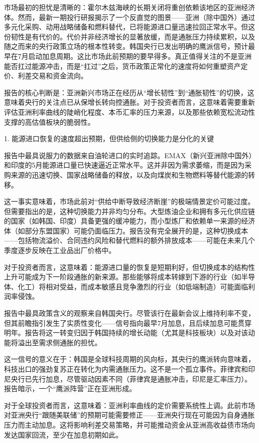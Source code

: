 \documentclass[11pt]{ctexart}
\begin{document}
市场最初的担忧是清晰的：霍尔木兹海峡的长期关闭将重创依赖该地区的亚洲经济体。然而，最新一期投行研报揭示了一个反直觉的图景——亚洲（除中国外）通过多元化采购、动用战略储备和燃料替代，已将能源进口量迅速拉回正常水平。但这份韧性是有代价的。代价并非经济增长的显著放缓，而是通胀压力持续累积，以及随之而来的央行政策立场的根本性转变。韩国央行已发出明确的鹰派信号，预计最早在7月启动加息周期。这比市场此前预期的要早得多。真正值得关注的不是亚洲能否扛过能源冲击，而是“扛过”之后，货币政策正常化的速度将如何重塑资产定价、利差交易和资金流向。

报告的核心判断是：亚洲新兴市场正在经历从“增长韧性”到“通胀韧性”的切换，这意味着央行的关注点已从保增长转向控通胀。对于投资者而言，这意味着需要重新评估亚洲利率曲线的陡峭化程度、本币汇率的压力来源，以及那些依赖宽松流动性支撑的高估值板块的脆弱性。

1. 能源进口恢复的速度超出预期，但供给侧的切换能力是分化的关键

报告中最具说服力的数据来自油轮进口的实时追踪。EMAX（新兴亚洲除中国外）和印度的5月能源进口量已快速逼近正常水平。这并非因为需求萎缩，而是因为采购来源的迅速切换、国家战略储备的释放，以及向煤炭和生物燃料等替代能源的转移。

这一事实意味着，市场此前对“供给中断导致经济断崖”的极端情景定价可能过度。但需要指出的是，这种切换能力并非均匀分布。大型炼油企业和拥有多元化供应链的国家（如韩国、印度）具备更强的缓冲能力，而小型炼厂和依赖单一来源的经济体（如部分东盟国家）可能仍面临压力。报告没有完全展开的是，这种切换成本——包括物流溢价、合同违约风险和替代燃料的额外排放成本——可能在未来几个季度逐步反映在工业品出厂价格中。

对于投资者而言，这意味着：能源进口量的恢复是短期利好，但切换成本的结构性上升可能成为下一阶段通胀的新来源。那些能够将成本转嫁到下游的行业（如半导体、化工）将相对受益，而成本敏感且竞争激烈的行业（如低端制造）可能面临利润率侵蚀。

报告中最具政策含义的观察来自韩国央行。尽管该行在最新会议上维持利率不变，但其前瞻指引发生了实质性变化——信号指向最早7月加息，且后续加息可能贯穿明年。报告将这一转变归因于韩国持续的增长动能（尤其是科技板块）以及对该动能将溢出至需求侧通胀的担忧。

这一信号的意义在于：韩国是全球科技周期的风向标，其央行的鹰派转向意味着，科技出口的强劲复苏正在转化为内需通胀压力。这不是一个孤立事件。菲律宾和印尼央行已先行加息，尽管驱动因素不同（菲律宾是通胀冲击，印尼是汇率压力）。报告暗示，一个“鹰派阵营”正在亚洲形成。

对于全球投资者而言，这意味着：亚洲利率曲线的定价需要系统性上调。此前市场对亚洲央行“跟随美联储”的预期可能需要修正——亚洲央行现在可能因为自身通胀压力而主动加息。这将影响利差交易策略，并可能推动资金从亚洲高收益债市场向发达国家回流，至少在加息初期如此。
\end{document}
